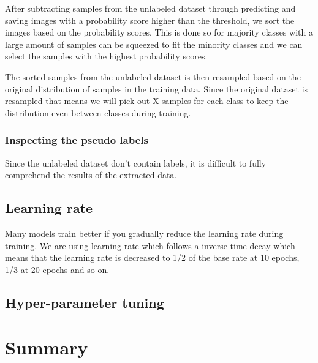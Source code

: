 \documentclass[thesis.tex]{subfiles}
\begin{document}
After subtracting samples from the unlabeled dataset through predicting and saving images with a probability score higher than the threshold, we sort the images based on the probability scores. This is done so for majority classes with a large amount of samples can be squeezed to fit the minority classes and we can select the samples with the highest probability scores.

The sorted samples from the unlabeled dataset is then resampled based on the original distribution of samples in the training data. Since the original dataset is resampled that means we will pick out X samples for each class to keep the distribution even between classes during training.

\subsubsection{Inspecting the pseudo labels}
Since the unlabeled dataset don't contain labels, it is difficult to fully comprehend the results of the extracted data.



\subsection{Learning rate}
Many models train better if you gradually reduce the learning rate during training. We are using learning rate which follows a inverse time decay which means that the learning rate is decreased to 1/2 of the base rate at 10 epochs, 1/3 at 20 epochs and so on.



\subsection{Hyper-parameter tuning}





\section{Summary} \label{sec:C3-summary}
\end{document}

